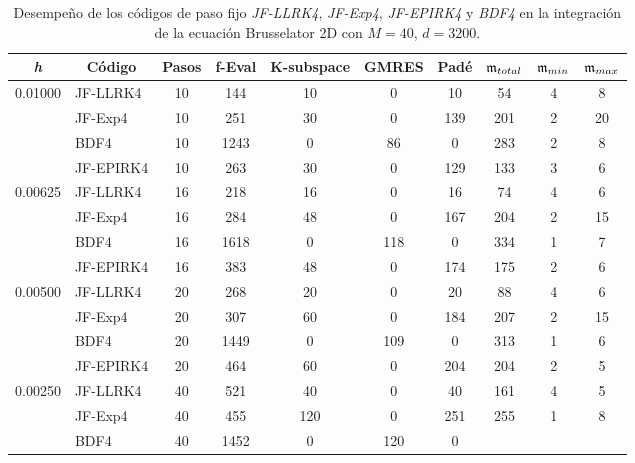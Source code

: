 \begin{table}
	\caption{Desempeño de los códigos de paso fijo \textit{JF-LLRK4}, \textit{JF-Exp4}, \textit{JF-EPIRK4} y \textit{BDF4} en la integración de la ecuación Brusselator 2D con $M=40$, $d=3200$.}
	\centering
	\begin{adjustbox}{width=0.9\columnwidth,center}
		\begin{tabular}{cccccccccc}
			\hline
			\textit{h} & Código & Pasos & f-Eval & K-subspace & GMRES & Padé & $\mathfrak{m}_{total}$ & $\mf%
			_{min}$ & $\mathfrak{m}_{max}$ \\ \hline
			\multicolumn{1}{l}{0.01000} & \multicolumn{1}{l}{JF-LLRK4} & 10 & 144 & 10
			& 0 & 10 & 54 & 4 & 8 \\
			\multicolumn{1}{l}{} & \multicolumn{1}{l}{JF-Exp4} & 10 & 251 & 30 & 0 & 139
			& 201 & 2 & 20 \\
			\multicolumn{1}{l}{} & \multicolumn{1}{l}{BDF4} & 10 & 1243 & 0 & 86 & 0 &
			283 & 2 & 8 \\
			\multicolumn{1}{l}{} & \multicolumn{1}{l}{JF-EPIRK4} & 10 & 263 & 30 & 0 &
			129 & 133 & 3 & 6 \\
			\multicolumn{1}{l}{0.00625} & \multicolumn{1}{l}{JF-LLRK4} & 16 & 218 & 16
			& 0 & 16 & 74 & 4 & 6 \\
			\multicolumn{1}{l}{} & \multicolumn{1}{l}{JF-Exp4} & 16 & 284 & 48 & 0 & 167
			& 204 & 2 & 15 \\
			\multicolumn{1}{l}{} & \multicolumn{1}{l}{BDF4} & 16 & 1618 & 0 & 118 & 0 &
			334 & 1 & 7 \\
			\multicolumn{1}{l}{} & \multicolumn{1}{l}{JF-EPIRK4} & 16 & 383 & 48 & 0 &
			174 & 175 & 2 & 6 \\
			\multicolumn{1}{l}{0.00500} & \multicolumn{1}{l}{JF-LLRK4} & 20 & 268 & 20 &
			0 & 20 & 88 & 4 & 6 \\
			\multicolumn{1}{l}{} & \multicolumn{1}{l}{JF-Exp4} & 20 & 307 & 60 & 0 & 184
			& 207 & 2 & 15 \\
			\multicolumn{1}{l}{} & \multicolumn{1}{l}{BDF4} & 20 & 1449 & 0 & 109 & 0 &
			313 & 1 & 6 \\
			\multicolumn{1}{l}{} & \multicolumn{1}{l}{JF-EPIRK4} & 20 & 464 & 60 & 0 &
			204 & 204 & 2 & 5 \\
			\multicolumn{1}{l}{0.00250} & \multicolumn{1}{l}{JF-LLRK4} & 40 & 521 & 40 &
			0 & 40 & 161 & 4 & 5 \\
			\multicolumn{1}{l}{} & \multicolumn{1}{l}{JF-Exp4} & 40 & 455 & 120 & 0 & 251
			& 255 & 1 & 8 \\
			\multicolumn{1}{l}{} & \multicolumn{1}{l}{BDF4} & 40 & 1452 & 0 & 120 & 0 &

\end{tabular}
\end{adjustbox}
\end{table}
